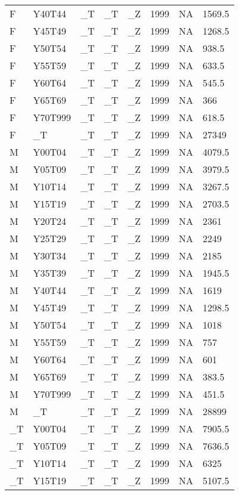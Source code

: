 \begin{longtable}[t]{llllllll}
F & Y40T44 & \_T & \_T & \_Z & 1999 & NA & 1569.5\\
\addlinespace
F & Y45T49 & \_T & \_T & \_Z & 1999 & NA & 1268.5\\
F & Y50T54 & \_T & \_T & \_Z & 1999 & NA & 938.5\\
F & Y55T59 & \_T & \_T & \_Z & 1999 & NA & 633.5\\
F & Y60T64 & \_T & \_T & \_Z & 1999 & NA & 545.5\\
F & Y65T69 & \_T & \_T & \_Z & 1999 & NA & 366\\
\addlinespace
F & Y70T999 & \_T & \_T & \_Z & 1999 & NA & 618.5\\
F & \_T & \_T & \_T & \_Z & 1999 & NA & 27349\\
M & Y00T04 & \_T & \_T & \_Z & 1999 & NA & 4079.5\\
M & Y05T09 & \_T & \_T & \_Z & 1999 & NA & 3979.5\\
M & Y10T14 & \_T & \_T & \_Z & 1999 & NA & 3267.5\\
\addlinespace
M & Y15T19 & \_T & \_T & \_Z & 1999 & NA & 2703.5\\
M & Y20T24 & \_T & \_T & \_Z & 1999 & NA & 2361\\
M & Y25T29 & \_T & \_T & \_Z & 1999 & NA & 2249\\
M & Y30T34 & \_T & \_T & \_Z & 1999 & NA & 2185\\
M & Y35T39 & \_T & \_T & \_Z & 1999 & NA & 1945.5\\
\addlinespace
M & Y40T44 & \_T & \_T & \_Z & 1999 & NA & 1619\\
M & Y45T49 & \_T & \_T & \_Z & 1999 & NA & 1298.5\\
M & Y50T54 & \_T & \_T & \_Z & 1999 & NA & 1018\\
M & Y55T59 & \_T & \_T & \_Z & 1999 & NA & 757\\
M & Y60T64 & \_T & \_T & \_Z & 1999 & NA & 601\\
\addlinespace
M & Y65T69 & \_T & \_T & \_Z & 1999 & NA & 383.5\\
M & Y70T999 & \_T & \_T & \_Z & 1999 & NA & 451.5\\
M & \_T & \_T & \_T & \_Z & 1999 & NA & 28899\\
\_T & Y00T04 & \_T & \_T & \_Z & 1999 & NA & 7905.5\\
\_T & Y05T09 & \_T & \_T & \_Z & 1999 & NA & 7636.5\\
\addlinespace
\_T & Y10T14 & \_T & \_T & \_Z & 1999 & NA & 6325\\
\_T & Y15T19 & \_T & \_T & \_Z & 1999 & NA & 5107.5\\

\end{longtable}
